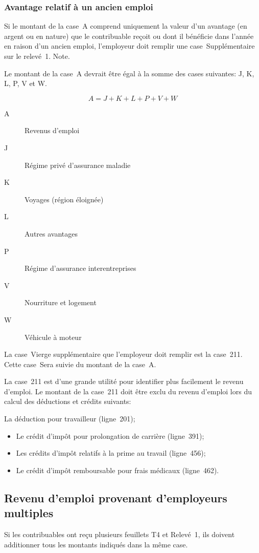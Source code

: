 \subsubsection{Avantage relatif à un ancien emploi}
\qc
Si le montant de la case~A comprend uniquement la valeur d'un avantage (en argent ou en nature) que le contribuable reçoit ou dont il bénéficie dans l'année en raison d'un ancien emploi, l'employeur doit remplir une case~Supplémentaire sur le relevé~1. 
Note.

\begin{note}
	Le montant de la case~A devrait être égal à la somme des cases suivantes: J, K, L, P, V et W.
\end{note}
\[ A = J + K + L + P + V + W\]
\begin{description}
	\item[A] Revenus d'emploi
	\item[J] Régime privé d'assurance maladie 
	\item[K] Voyages (région éloignée) 
	\item[L] Autres avantages
	\item[P] Régime d'assurance interentreprises 
	\item[V] Nourriture et logement 
	\item[W] Véhicule à moteur 
\end{description}

La case~Vierge supplémentaire que l'employeur doit remplir est la case~211. Cette case~Sera suivie du montant de la case~A.

La case~211 est d'une grande utilité pour identifier plus facilement le revenu d'emploi.  Le montant de la case~211 doit être exclu du revenu d'emploi lors du calcul des déductions et crédits suivants:

La déduction pour travailleur (ligne~201);
\begin{itemize}
	\item Le crédit d'impôt pour prolongation de carrière (ligne~391);
	\item Les crédits d'impôt relatifs à la prime au travail (ligne~456);
	\item Le crédit d'impôt remboursable pour frais médicaux (ligne~462).
\end{itemize}

\subsection{Revenu d'emploi provenant d'employeurs multiples}
Si les contribuables ont reçu plusieurs feuillets T4 et Relevé~1, ils doivent additionner tous les montants indiqués dans la même case.

